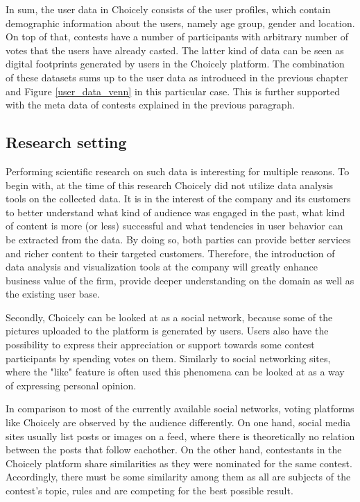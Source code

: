 In sum, the user data in Choicely consists of the user profiles, which contain demographic information about the users, namely age group, gender and location. On top of that, contests have a number of participants with arbitrary number of votes that the users have already casted. The latter kind of data can be seen as digital footprints generated by users in the Choicely platform. The combination of these datasets sums up to the user data as introduced in the previous chapter and Figure \ref{user_data_venn} in this particular case. This is further supported with the meta data of contests explained in the previous paragraph. 

\subsection{Research setting}
    Performing scientific research on such data is interesting for multiple reasons. To begin with, at the time of this research Choicely did not utilize data analysis tools on the collected data. It is in the interest of the company and its customers to better understand what kind of audience was engaged in the past, what kind of content is more (or less) successful and what tendencies in user behavior can be extracted from the data. By doing so, both parties can provide better services and richer content to their targeted customers. Therefore, the introduction of data analysis and visualization tools at the company will greatly enhance business value of the firm, provide deeper understanding on the domain as well as the existing user base.   
    
    Secondly, Choicely can be looked at as a social network, because some of the pictures uploaded to the platform is generated by users. Users also have the possibility to express their appreciation or support towards some contest participants by spending votes on them. Similarly to social networking sites, where the "like" feature is often used \cite{jang2015noreciprocity, bakhshi2014faces} this phenomena can be looked at as a way of expressing personal opinion. 
    
    In comparison to most of the currently available social networks, voting platforms like Choicely are observed by the audience differently. On one hand, social media sites usually list posts or images on a feed, where there is theoretically no relation between the posts that follow eachother. %
    On the other hand, contestants in the Choicely platform share similarities as they were nominated for the same contest. Accordingly, there must be some similarity among them as all are subjects of the contest's topic, rules and are competing for the best possible result. 

